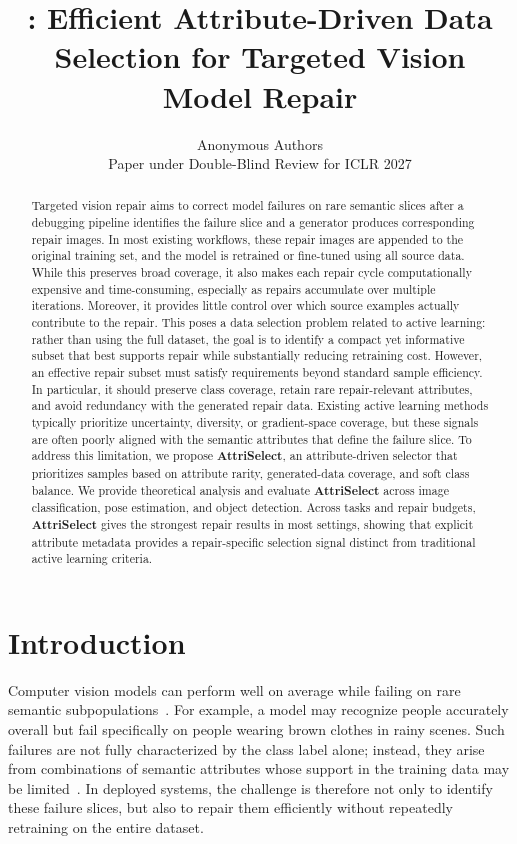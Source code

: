 \documentclass{article}
\title{\modelplain: Efficient Attribute-Driven Data Selection for Targeted Vision Model Repair}
\author{%
  Anonymous Authors \\
  Paper under Double-Blind Review for ICLR 2027 %
}
\newcommand{\modelname}{AttriSelect}
\newcommand{\model}{\textcolor{darkteal}{\textbf{\modelname}}\xspace}
\begin{document}
\maketitle

\begin{abstract}
Targeted vision repair aims to correct model failures on rare semantic slices after a debugging pipeline identifies the failure slice and a generator produces corresponding repair images. In most existing workflows, these repair images are appended to the original training set, and the model is retrained or fine-tuned using all source data. While this preserves broad coverage, it also makes each repair cycle computationally expensive and time-consuming, especially as repairs accumulate over multiple iterations. Moreover, it provides little control over which source examples actually contribute to the repair. This poses a data selection problem related to active learning: rather than using the full dataset, the goal is to identify a compact yet informative subset that best supports repair while substantially reducing retraining cost. However, an effective repair subset must satisfy requirements beyond standard sample efficiency. In particular, it should preserve class coverage, retain rare repair-relevant attributes, and avoid redundancy with the generated repair data. Existing active learning methods typically prioritize uncertainty, diversity, or gradient-space coverage, but these signals are often poorly aligned with the semantic attributes that define the failure slice. To address this limitation, we propose \textbf{\model}, an attribute-driven selector that prioritizes samples based on attribute rarity, generated-data coverage, and soft class balance. We provide theoretical analysis and evaluate \model across image classification, pose estimation, and object detection. Across tasks and repair budgets, \model gives the strongest repair results in most settings, showing that explicit attribute metadata provides a repair-specific selection signal distinct from traditional active learning criteria.
\end{abstract}

\section{Introduction}

Computer vision models can perform well on average while failing on rare semantic subpopulations~\citep{barbu2019objectnet,geirhos2020shortcut,chen2023hibug}. For example, a model may recognize people accurately overall but fail specifically on people wearing brown clothes in rainy scenes. Such failures are not fully characterized by the class label alone; instead, they arise from combinations of semantic attributes whose support in the training data may be limited~\citep{buolamwini2018gender,eyuboglu2022domino}. In deployed systems, the challenge is therefore not only to identify these failure slices, but also to repair them efficiently without repeatedly retraining on the entire dataset.
\end{document}
